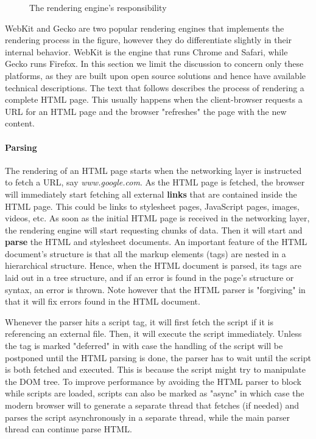\begin{figure}
\begin{center}
\end{center}
\caption{The rendering engine's responsibility}\label{fig:render}
\end{figure}

WebKit\cite{webkit} and Gecko\cite{gecko} are two popular rendering engines that implements the rendering process in the figure, however they do differentiate slightly in their internal behavior. WebKit is the engine that runs Chrome and Safari, while Gecko runs Firefox. In this section we  limit the discussion to concern only these platforms, as they are built upon open source solutions and hence have available technical descriptions. The text that follows describes the process of rendering a complete HTML page. This usually happens when the client-browser requests a URL for an HTML page and the browser "refreshes" the page with the new content.

\paragraph{Parsing} 
The rendering of an HTML page starts when the networking layer is instructed to fetch a URL, say \textit{www.google.com}. As the HTML page is fetched, the browser will immediately start fetching all external \textbf{links} that are contained inside the HTML page. This could be links to stylesheet pages, JavaScript pages, images, videos, etc. As soon as the initial HTML page is received in the networking layer, the rendering engine will start requesting chunks of data. Then it will start and \textbf{parse} the HTML and stylesheet documents. An important feature of the HTML document's structure is that all the markup elements (tags) are nested in a hierarchical structure. Hence, when the HTML document is parsed, its tags are laid out in a tree structure, and if an error is found in the page's structure or syntax, an error is thrown. Note however that the HTML parser is "forgiving" in that it will fix errors found in the HTML document.

Whenever the parser hits a script tag, it will first fetch the script if it is referencing an external file. Then, it will execute the script immediately. Unless the tag is marked "deferred" in with case the handling of the script will be postponed until the HTML parsing is done, the parser has to wait until the script is both fetched and executed. This is because the script might try to manipulate the DOM tree. To improve performance by avoiding the HTML parser to block while scripts are loaded, scripts can also be marked as "async" in which case the modern browser will to generate a separate thread that fetches (if needed) and parses the script asynchronously in a separate thread, while the main parser thread can continue parse HTML. 
 
